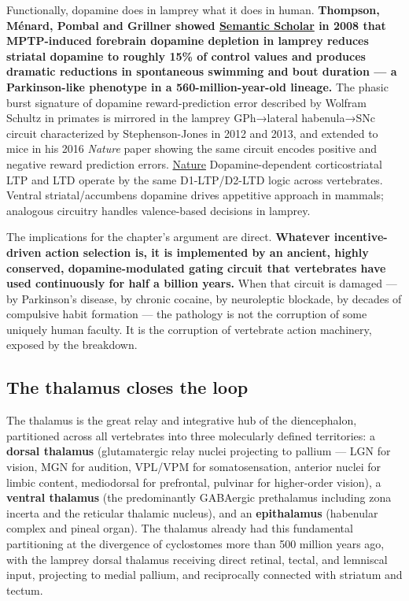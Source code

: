 Functionally, dopamine does in lamprey what it does in human. \textbf{Thompson, Ménard, Pombal and Grillner showed \href{https://www.semanticscholar.org/paper/The-Basal-Ganglia-Over-500-Million-Years-Grillner-Robertson/97ee475166bf993d3e74ef14e056b2aab025e04d}{Semantic Scholar} in 2008 that MPTP-induced forebrain dopamine depletion in lamprey reduces striatal dopamine to roughly 15\% of control values and produces dramatic reductions in spontaneous swimming and bout duration --- a Parkinson-like phenotype in a 560-million-year-old lineage.} The phasic burst signature of dopamine reward-prediction error described by Wolfram Schultz in primates is mirrored in the lamprey GPh→lateral habenula→SNc circuit characterized by Stephenson-Jones in 2012 and 2013, and extended to mice in his 2016 \emph{Nature} paper showing the same circuit encodes positive and negative reward prediction errors. \href{https://www.nature.com/articles/nature19845}{Nature} Dopamine-dependent corticostriatal LTP and LTD operate by the same D1-LTP/D2-LTD logic across vertebrates. Ventral striatal/accumbens dopamine drives appetitive approach in mammals; analogous circuitry handles valence-based decisions in lamprey.

The implications for the chapter's argument are direct. \textbf{Whatever incentive-driven action selection is, it is implemented by an ancient, highly conserved, dopamine-modulated gating circuit that vertebrates have used continuously for half a billion years.} When that circuit is damaged --- by Parkinson's disease, by chronic cocaine, by neuroleptic blockade, by decades of compulsive habit formation --- the pathology is not the corruption of some uniquely human faculty. It is the corruption of vertebrate action machinery, exposed by the breakdown.

\subsection{The thalamus closes the loop}\label{05_vertebrates-the-thalamus-closes-the-loop}

The thalamus is the great relay and integrative hub of the diencephalon, partitioned across all vertebrates into three molecularly defined territories: a \textbf{dorsal thalamus} (glutamatergic relay nuclei projecting to pallium --- LGN for vision, MGN for audition, VPL/VPM for somatosensation, anterior nuclei for limbic content, mediodorsal for prefrontal, pulvinar for higher-order vision), a \textbf{ventral thalamus} (the predominantly GABAergic prethalamus including zona incerta and the reticular thalamic nucleus), and an \textbf{epithalamus} (habenular complex and pineal organ). The thalamus already had this fundamental partitioning at the divergence of cyclostomes more than 500 million years ago, with the lamprey dorsal thalamus receiving direct retinal, tectal, and lemniscal input, projecting to medial pallium, and reciprocally connected with striatum and tectum.

